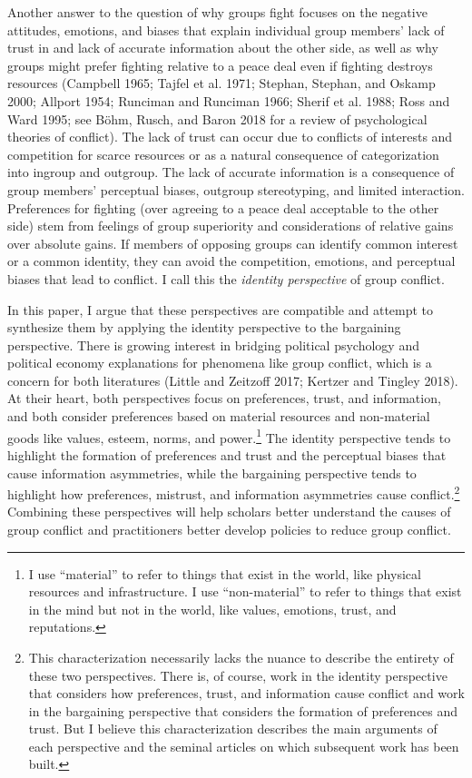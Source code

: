 \documentclass[11pt]{article}
\begin{document}
Another answer to the question of why groups fight focuses on the
negative attitudes, emotions, and biases that explain individual group
members' lack of trust in and lack of accurate information about the
other side, as well as why groups might prefer fighting relative to a
peace deal even if fighting destroys resources (Campbell 1965; Tajfel et
al. 1971; Stephan, Stephan, and Oskamp 2000; Allport 1954; Runciman and
Runciman 1966; Sherif et al. 1988; Ross and Ward 1995; see Böhm, Rusch,
and Baron 2018 for a review of psychological theories of conflict). The
lack of trust can occur due to conflicts of interests and competition
for scarce resources or as a natural consequence of categorization into
ingroup and outgroup. The lack of accurate information is a consequence
of group members' perceptual biases, outgroup stereotyping, and limited
interaction. Preferences for fighting (over agreeing to a peace deal
acceptable to the other side) stem from feelings of group superiority
and considerations of relative gains over absolute gains. If members of
opposing groups can identify common interest or a common identity, they
can avoid the competition, emotions, and perceptual biases that lead to
conflict. I call this the \emph{identity perspective} of group conflict.

In this paper, I argue that these perspectives are compatible and
attempt to synthesize them by applying the identity perspective to the
bargaining perspective. There is growing interest in bridging political
psychology and political economy explanations for phenomena like group
conflict, which is a concern for both literatures (Little and Zeitzoff
2017; Kertzer and Tingley 2018). At their heart, both perspectives focus
on preferences, trust, and information, and both consider preferences
based on material resources and non-material goods like values, esteem,
norms, and power.\footnote{I use ``material'' to refer to things that
  exist in the world, like physical resources and infrastructure. I use
  ``non-material'' to refer to things that exist in the mind but not in
  the world, like values, emotions, trust, and reputations.} The
identity perspective tends to highlight the formation of preferences and
trust and the perceptual biases that cause information asymmetries,
while the bargaining perspective tends to highlight how preferences,
mistrust, and information asymmetries cause conflict.\footnote{This
  characterization necessarily lacks the nuance to describe the entirety
  of these two perspectives. There is, of course, work in the identity
  perspective that considers how preferences, trust, and information
  cause conflict and work in the bargaining perspective that considers
  the formation of preferences and trust. But I believe this
  characterization describes the main arguments of each perspective and
  the seminal articles on which subsequent work has been built.}
Combining these perspectives will help scholars better understand the
causes of group conflict and practitioners better develop policies to
reduce group conflict.
\end{document}
